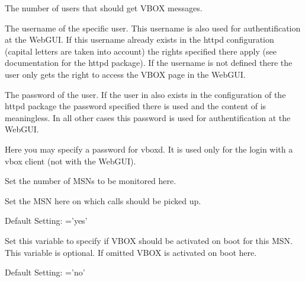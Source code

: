 \begin{description}


    The number of users that should get VBOX messages.


    The username of the specific user. This username is also used for authentification
    at the WebGUI. If this username already exists in the httpd configuration (capital
    letters are taken into account) the rights specified there apply (see documentation
    for the httpd package). If the username is not defined there the user only gets
    the right to access the VBOX page in the WebGUI.


    The password of the user. If the user in  also exists in
    the configuration of the httpd package the password specified there is used and
    the content of  is meaningless. In all other cases
    this password is used for authentification at the WebGUI.
    

    Here you may specify a password for vboxd. It is used only for the login
    with a vbox client (not with the WebGUI).
    

    Set the number of MSNs to be monitored here. 


    Set the MSN here on which calls should be picked up.


    Default Setting: ='yes'

    Set this variable to specify if VBOX should be activated on boot for this MSN.
    This variable is optional. If omitted VBOX is activated on boot here. 


    Default Setting: ='no'


\end{description}
